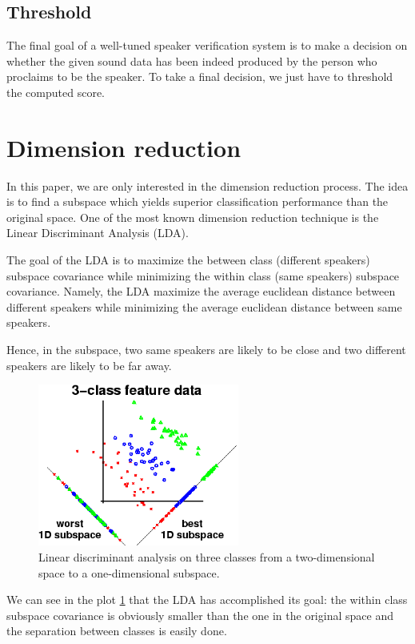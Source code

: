 \documentclass{techrep}
\begin{document}
\subsection{Threshold}

The final goal of a well-tuned speaker verification system is to make a decision
on whether the given sound data has been indeed produced by the person who proclaims
to be the speaker.
To take a final decision, we just have to threshold the computed score.


\section{Dimension reduction}

In this paper, we are only interested in the dimension reduction
process. The idea is to find a subspace which yields superior
classification performance than the original space. One of the most
known dimension reduction technique is the Linear Discriminant
Analysis (LDA).

The goal of the LDA is to maximize the between class (different
speakers) subspace covariance while minimizing the within class (same
speakers) subspace covariance. Namely, the LDA maximize the average
euclidean distance between different speakers while minimizing the
average euclidean distance between same speakers.


Hence, in the subspace, two same speakers are likely to be close and two different
speakers are likely to be far away.

\begin{figure}[H]
  \centering
  \includegraphics[width=250px]{lda}
  \caption{Linear discriminant analysis on three classes from a two-dimensional space to a one-dimensional subspace.}
  \label{lda}
\end{figure}

We can see in the plot \ref{lda} that the LDA has accomplished its
goal: the within class subspace covariance is obviously smaller than
the one in the original space and the separation between classes is
easily done.
\end{document}
